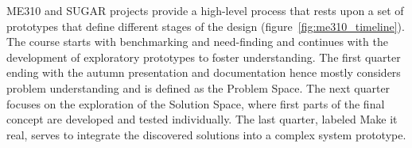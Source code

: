 ME310 and SUGAR projects provide a high-level process that rests upon a set of prototypes that define different stages of the design (figure~\ref{fig:me310_timeline}). The course starts with benchmarking and need-finding and continues with the development of exploratory prototypes to foster understanding. The first quarter ending with the autumn presentation and documentation hence mostly considers problem understanding and is defined as the Problem Space. The next quarter focuses on the exploration of the Solution Space, where first parts of the final concept are developed and tested individually. The last quarter, labeled Make it real, serves to integrate the discovered solutions into a complex system prototype. 